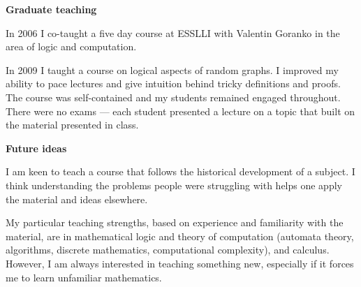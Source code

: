 \documentclass[12pt]{article}
\theoremstyle{plain} \numberwithin{equation}{section}
\theoremstyle{definition}
\begin{document}
{\bf Graduate teaching}

In 2006 I co-taught a five day course at ESSLLI with Valentin Goranko in the area of logic and computation. 

In 2009 I taught a course on logical aspects of random graphs. I improved my ability to pace lectures and give intuition
behind tricky definitions and proofs. The course was self-contained and my students remained engaged throughout. 
There were no exams --- each student presented a lecture on a topic that built on the material presented in class.

{\bf Future ideas}

I am keen to teach a course that follows the historical development of a subject. I think understanding the
problems people were struggling with helps one apply the material and ideas elsewhere.



My particular teaching strengths, based on experience and familiarity with the material, are in mathematical logic and theory of computation (automata theory, algorithms, discrete mathematics, computational complexity), and calculus. However, I am always interested in teaching something new, especially if it forces me to learn unfamiliar mathematics. %
\end{document}
